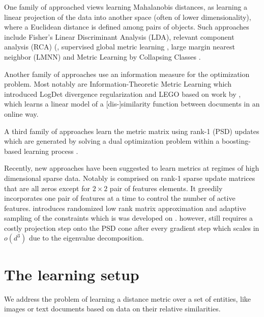 \documentclass{article}
\begin{document}
One family of approached views learning Mahalanobis distances, as learning a linear projection of the data into another space (often of lower dimensionality), where a Euclidean distance is
defined among pairs of objects. Such approaches include Fisher’s Linear Discriminant Analysis
(LDA), relevant component analysis (RCA) (, supervised global
metric learning , large margin nearest neighbor (LMNN)  and Metric Learning by Collapsing Classes .

Another family of approaches use an information measure for the optimization problem. Most notably are Information-Theoretic Metric Learning  which introduced LogDet divergence regularization and LEGO \cite{lego} based on work by , which learns a linear model of a [dis-]similarity function between documents in an online way.

A third family of approaches \cite{boost}  learn the metric matrix using rank-1 (PSD) updates which are generated by solving a dual optimization problem within a boosting-based learning process .


Recently, new approaches have been suggested to learn metrics at regimes of high dimensional sparse data. Notably \cite{hdsl} is comprised on rank-1 sparse update matrices that are all zeros except for $2\times2$ pair of features elements. It greedily incorporates one pair of features at a time to control the number of active features. \cite{qian2014} introduces randomized low rank matrix approximation and adaptive sampling of the constraints which is was developed on \cite{qian}. \cite{qian} however, still requires a costly projection step onto the PSD cone after every gradient step which scales in $o(d^3)$ due to the eigenvalue decomposition.

\section{The learning setup}
We address the problem of learning a distance metric over a set of
entities, like images or text documents based on data on their
relative similarities. 
\end{document}
